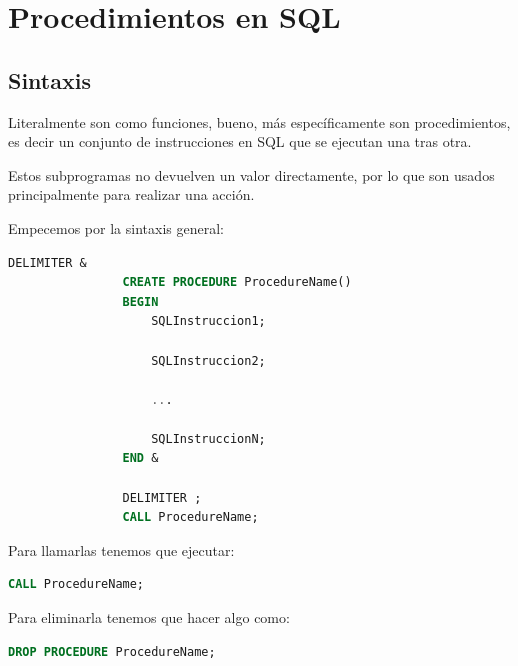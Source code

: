\documentclass[12pt, fleqn]{report}                             %
\theoremstyle{break}                                            %
\begin{document}
    \clearpage
    \chapter{Procedimientos en SQL}


        \clearpage
        \section{Sintaxis}

            Literalmente son como funciones, bueno, más específicamente son procedimientos,
            es decir un conjunto de instrucciones en SQL que se ejecutan una tras otra.

            Estos subprogramas no devuelven un valor directamente, por lo que son usados
            principalmente para realizar una acción.


            Empecemos por la sintaxis general:

            \begin{lstlisting}[language=SQL, gobble=16]
                DELIMITER &
                CREATE PROCEDURE ProcedureName()
                BEGIN
                    SQLInstruccion1;

                    SQLInstruccion2;

                    ...

                    SQLInstruccionN;
                END &

                DELIMITER ;
                CALL ProcedureName;
            \end{lstlisting}

            Para llamarlas tenemos que ejecutar:
            \begin{lstlisting}[language=SQL, gobble=16]
                CALL ProcedureName;
            \end{lstlisting}

            Para eliminarla tenemos que hacer algo como:
            \begin{lstlisting}[language=SQL, gobble=16]
                DROP PROCEDURE ProcedureName;
            \end{lstlisting}
\end{document}
